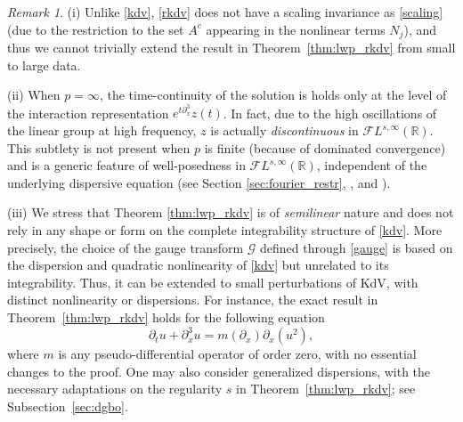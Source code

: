 \documentclass[%
11pt,  reqno]{amsart}
\newcommand{\5}{\textup{V}}
\newcommand{\noi}{\noindent}
\newcommand{\FL}{\mathcal{F} L}
\newcommand{\dx}{\partial_x}
\theoremstyle{remark}
\newtheorem{remark}[theorem]{Remark}
\newcommand{\R}{\mathbb{R}}
\newcommand{\Gc}{\mathcal{G}}
\numberwithin{equation}{section}
\numberwithin{theorem}{section}
\begin{document}
\begin{remark}
\noi(i)
Unlike \eqref{kdv}, \eqref{rkdv} does not have a scaling invariance as \eqref{scaling} (due to the restriction to the set $A^c$ appearing in the nonlinear terms $N_j$), and thus we cannot trivially extend the result in Theorem~\ref{thm:lwp_rkdv} from small to large data. 


\smallskip 

\label{remark:Linfty_continuity}
\noi (ii) When $p=\infty$, the time-continuity of the solution is holds only at the level of the interaction representation $e^{t\dx^3}z(t)$. In fact, due to the high oscillations of the linear group at high frequency, $z$ is actually \emph{discontinuous} in $\FL^{s,\infty}(\R)$. This subtlety is not present when $p$ is finite (because of dominated convergence) and is a generic feature of well-posedness in $\FL^{s,\infty}(\R)$, independent of the underlying dispersive equation (see Section \ref{sec:fourier_restr}, \cite[Section 7]{CC24}, and \cite[Remark~1.4.6]{Forlano}).


\smallskip 

\noi(iii)
We stress that Theorem \ref{thm:lwp_rkdv} is of \emph{semilinear} nature and does not rely in any shape or form on the complete integrability structure of \eqref{kdv}. 
		More precisely, the choice of the gauge transform $\Gc$ defined through \eqref{gauge} is based on the dispersion and quadratic nonlinearity of \eqref{kdv} but unrelated to its integrability. Thus, it can be extended to small perturbations of KdV, with distinct nonlinearity or dispersions. For instance, the exact result in Theorem~\ref{thm:lwp_rkdv} holds for the following equation
		\begin{equation}
			\partial_t u + \partial_x^3 u = m(\partial_x)\partial_x(u^2),
		\end{equation}
		where $m$ is any pseudo-differential operator of order zero, 
        with no essential changes to the proof.
 One may also consider generalized dispersions, with the necessary adaptations on the regularity $s$ in Theorem~\ref{thm:lwp_rkdv}; see Subsection~\ref{sec:dgbo}.


\end{remark}
\end{document}
